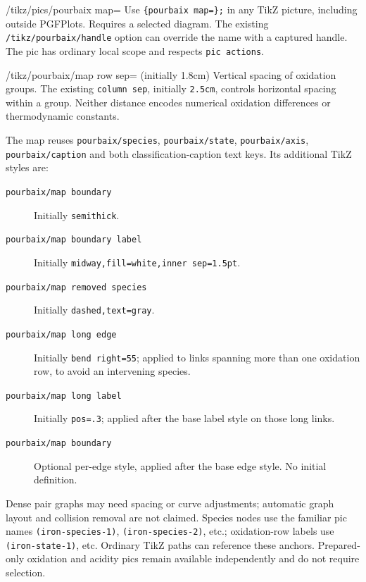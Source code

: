 \documentclass[a4paper,11pt]{ltxdoc}
\begin{document}
\begin{key}{/tikz/pics/pourbaix map=}
Use \texttt{\string\pic \{pourbaix map=\};} in any TikZ picture,
including outside PGFPlots. Requires a selected diagram. The existing
\texttt{/tikz/pourbaix/handle} option can override the name with a captured
handle. The pic has ordinary local scope and respects \texttt{pic actions}.
\end{key}

\begin{codeexample}[width=7cm]
\end{codeexample}

\begin{key}{/tikz/pourbaix/map row sep= (initially 1.8cm)}
Vertical spacing of oxidation groups. The existing \texttt{column sep}, initially
\texttt{2.5cm}, controls horizontal spacing within a group. Neither distance
encodes numerical oxidation differences or thermodynamic constants.
\end{key}
The map reuses \texttt{pourbaix/species}, \texttt{pourbaix/state},
\texttt{pourbaix/axis}, \texttt{pourbaix/caption} and both classification-caption
text keys. Its additional TikZ styles are:
\begin{description}
\item[\texttt{pourbaix/map boundary}] Initially \texttt{semithick}.
\item[\texttt{pourbaix/map boundary label}] Initially
  \texttt{midway,fill=white,inner sep=1.5pt}.
\item[\texttt{pourbaix/map removed species}] Initially \texttt{dashed,text=gray}.
\item[\texttt{pourbaix/map long edge}] Initially \texttt{bend right=55}; applied
  to links spanning more than one oxidation row, to avoid an intervening species.
\item[\texttt{pourbaix/map long label}] Initially \texttt{pos=.3}; applied after
  the base label style on those long links.
\item[\texttt{pourbaix/map boundary }] Optional per-edge style, applied
  after the base edge style. No initial definition.
\end{description}
Dense pair graphs may need spacing or curve adjustments; automatic graph layout
and collision removal are not claimed. Species nodes use the familiar pic names
\texttt{(iron-species-1)}, \texttt{(iron-species-2)}, etc.; oxidation-row labels
use \texttt{(iron-state-1)}, etc. Ordinary TikZ paths can reference these anchors.
Prepared-only oxidation and acidity pics remain available independently and do
not require selection.
\end{document}
